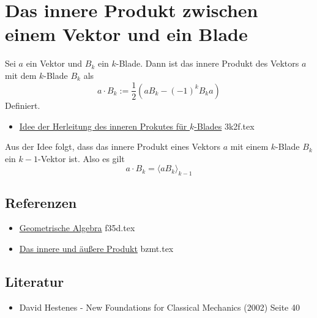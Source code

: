 \documentclass{sajzk}
\begin{document}
\section{Das innere Produkt zwischen einem Vektor und ein Blade}
\label{ozr9}

Sei $a$ ein Vektor und $B_k$ ein $k$-Blade. Dann ist das innere Produkt des
Vektors $a$ mit dem $k$-Blade $B_k$ als
$$a\cdot B_k:= \frac{1}{2}(aB_k-(-1)^kB_ka)$$
Definiert.

\begin{itemize}
    \item \href{3k2f.pdf}{Idee der Herleitung des inneren Prokutes für $k$-Blades} 3k2f.tex
\end{itemize}

Aus der Idee folgt, dass das innere Produkt eines Vektors $a$ mit einem
$k$-Blade $B_k$ ein $k-1$-Vektor ist. Also es gilt
$$a\cdot B_k = \langle aB_k\rangle_{k-1}$$

\subsection{Referenzen} 
\begin{itemize}
    \item \href{f35d.pdf}{Geometrische Algebra} f35d.tex
    \item \href{bzmt.pdf}{Das innere und äußere Produkt} bzmt.tex
\end{itemize}

\subsection{Literatur} 
\begin{itemize}
    \item David Hestenes - New Foundations for Classical Mechanics (2002) Seite 40
\end{itemize}
\end{document}
